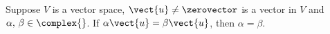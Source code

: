 Suppose $V$ is a vector space, $\vect{u}\neq\zerovector$ is a vector in $V$ and $\alpha,\,\beta\in\complex{\null}$. If $\alpha\vect{u}=\beta\vect{u}$, then $\alpha=\beta$.
